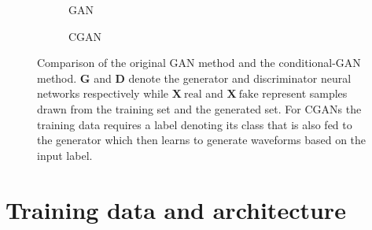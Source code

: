 \documentclass[12pt]{iopart}
\newcommand{\chris}[1]{\textbf{\textcolor{green}{CHRIS: #1}}}
\begin{document}
\begin{figure}[h!]
    \begin{subfigure}{.5\textwidth}
     \centering
        
        \caption{GAN}
    \end{subfigure}
    \begin{subfigure}{.5\textwidth}
     \centering
        
        \caption{CGAN}
    \end{subfigure}
    \caption{Comparison of the original GAN method and the
conditional-GAN method. $\textbf{G}$ and $\textbf{D}$ denote the generator and discriminator neural networks respectively while $\textbf{X}~\text{real}$ and $\textbf{X}~\text{fake}$ represent samples drawn from the training set and the generated set. For CGANs the training data requires a label denoting
its class that is also fed to the generator which then learns to generate
waveforms based on the input label.}

\label{fig:gan_comparison}
\end{figure}

\section{Training data and architecture} \label{Method}

\end{document}
